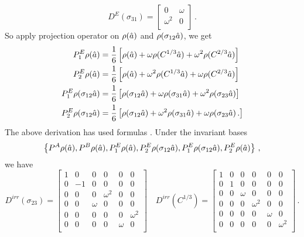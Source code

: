 {\begin{equation}
    D^E(\sigma_{31}) =
    \begin{bmatrix}
      0 & \omega  \\
      \omega^2 & 0 \\
    \end{bmatrix}  \,.
    \label{eq:c3E_2}
  \end{equation}
  So apply projection operator  on $\rho(\hat{a})$ and
  $\rho(\sigma_{12}\hat{a})$, we get
  \begin{align}
    P^E_1\rho(\hat{a})
    & = \frac{1}{6}
      \left[
      \rho(\hat{a}) + \omega \rho(C^{1/3} \hat{a}) + \omega^2 \rho(C^{2/3} \hat{a})
      \right] \\
    P^E_2\rho(\hat{a})
    & = \frac{1}{6}
      \left[
      \rho(\hat{a}) + \omega^2 \rho(C^{1/3} \hat{a}) + \omega \rho(C^{2/3} \hat{a})
      \right]  \\
    P^E_1\rho(\sigma_{12}\hat{a})
    & = \frac{1}{6}
      \left[
      \rho(\sigma_{12}\hat{a}) + \omega \rho(\sigma_{31} \hat{a}) + \omega^2 \rho(\sigma_{23} \hat{a})
      \right] \\
    P^E_2\rho(\sigma_{12}\hat{a})
    & = \frac{1}{6}
      \left[
      \rho(\sigma_{12}\hat{a}) + \omega^2 \rho(\sigma_{31} \hat{a}) + \omega \rho(\sigma_{23} \hat{a})
      \,.
      \right]
  \end{align}
  The above derivation has used formulas .
  Under the invariant bases
  \[
    \left\{
      P^A\rho(\hat{a}), P^B\rho(\hat{a}), P^E_1\rho(\hat{a}), P^E_2\rho(\sigma_{12}\hat{a}),
      P^E_1\rho(\sigma_{12}\hat{a}),  P^E_2\rho(\hat{a})
    \right\}
    \,,
  \]
  we have
  \[
    D^{irr}(\sigma_{23}) =
    \begin{bmatrix}
      1 & 0 & 0 & 0 & 0 & 0 \\
      0 & -1 & 0 & 0 & 0 & 0 \\
      0 & 0 & 0 & \omega^2 & 0 & 0 \\
      0 & 0 & \omega & 0 & 0 & 0 \\
      0 & 0 & 0 & 0 & 0 & \omega^2 \\
      0 & 0 & 0 & 0 & \omega & 0 \\
    \end{bmatrix}
    \quad
    D^{irr}(C^{1/3}) =
    \begin{bmatrix}
      1 & 0 & 0 & 0 & 0 & 0 \\
      0 & 1 & 0 & 0 & 0 & 0 \\
      0 & 0 & \omega & 0 & 0 & 0 \\
      0 & 0 & 0 & \omega^2 & 0 & 0 \\
      0 & 0 & 0 & 0 & \omega & 0 \\
      0 & 0 & 0 & 0 & 0 & \omega^2 \\
    \end{bmatrix}
    \,.
  \]
} %

